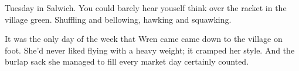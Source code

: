 
Tuesday in Salwich.
You could barely hear youself think over the racket in the village green.
Shuffling and bellowing, hawking and squawking.

It was the only day of the week that Wren came came down to the village on foot.
She'd never liked flying with a heavy weight; it cramped her style.
And the burlap sack she managed to fill every market day certainly counted.
